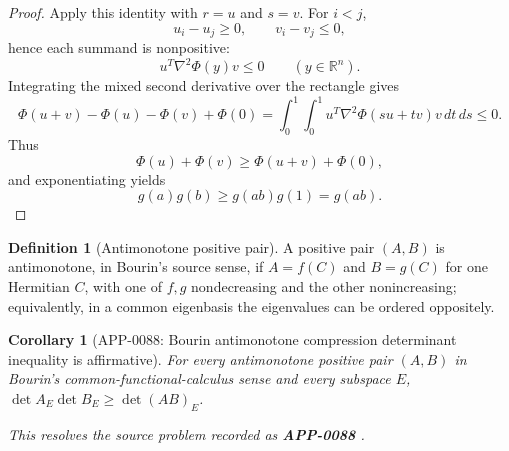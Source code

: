 \documentclass[11pt]{article}
\numberwithin{equation}{section}
\newtheorem{corollary}[theorem]{Corollary}
\theoremstyle{definition}
\newtheorem{definition}{Definition}[section]
\theoremstyle{remark}
\newcommand{\1}{\mathbf 1}
\begin{document}
\begin{proof}
Apply this identity with \(r=u\) and \(s=v\). For \(i<j\),
\[
u_i-u_j\ge0,\qquad v_i-v_j\le0,
\]
hence each summand is nonpositive:
\[
u^T\nabla^2\Phi(y)v\le0\qquad(y\in\mathbb R^n).
\]
Integrating the mixed second derivative over the rectangle gives
\[
\Phi(u+v)-\Phi(u)-\Phi(v)+\Phi(0)
=\int_0^1\int_0^1
u^T\nabla^2\Phi(su+tv)v\,dt\,ds
\le0.
\]
Thus
\[
\Phi(u)+\Phi(v)\ge \Phi(u+v)+\Phi(0),
\]
and exponentiating yields
\[
g(a)g(b)\ge g(ab)g(1)=g(ab).
\]
\end{proof}

\begin{definition}[Antimonotone positive pair]
\label{res:antimonotone-positive-pair}
A positive pair \((A,B)\) is antimonotone, in Bourin's source sense, if \(A=f(C)\) and \(B=g(C)\) for one Hermitian \(C\), with one of \(f,g\) nondecreasing and the other nonincreasing; equivalently, in a common eigenbasis the eigenvalues can be ordered oppositely.
\end{definition}

\begin{corollary}[APP-0088: Bourin antimonotone compression determinant inequality is affirmative]
\label{res:bourin-antimonotone-compressiondet-allsubspaces}
For every antimonotone positive pair \((A,B)\) in Bourin's common-functional-calculus sense and every subspace \(E\), \(\det A_E\det B_E\ge\det(AB)_E\).



This resolves the source problem recorded as \textbf{APP-0088} \cite{app-app-0088-source}.
\end{corollary}
\end{document}
